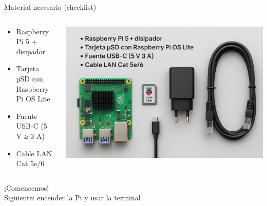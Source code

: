 \documentclass[aspectratio=169,professionalfonts]{beamer}
\begin{document}
\begin{frame}{Material necesario (checklist)}
  \begin{columns}[T]
    \begin{column}{0.48\textwidth}
      \begin{itemize}
        \item Raspberry Pi 5 + disipador
        \item Tarjeta µSD con Raspberry Pi OS Lite
        \item Fuente USB-C (5 V ≥ 3 A)
        \item Cable LAN Cat 5e/6
      \end{itemize}
    \end{column}
    \begin{column}{0.48\textwidth}
      \includegraphics[width=\linewidth]{pi-implements.png}
    \end{column}
  \end{columns}
\end{frame}

\begin{frame}%
  ¡Comencemos!\\
  \small Siguiente: encender la Pi y usar la terminal
\end{frame}
\end{document}
